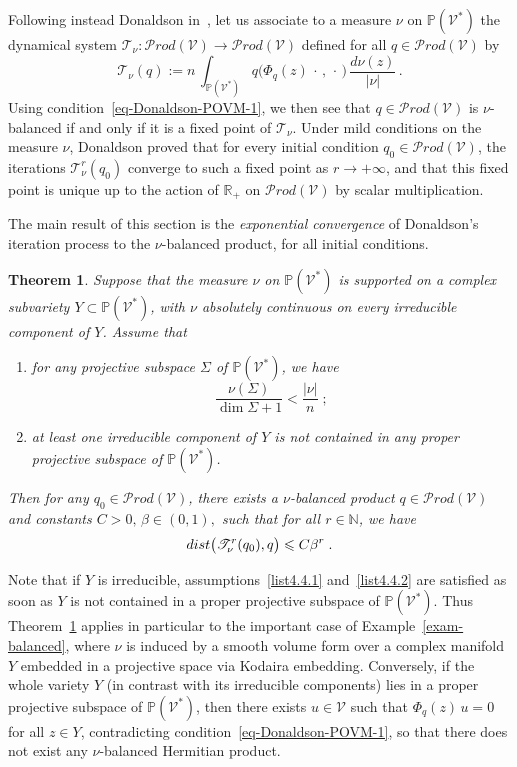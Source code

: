 \documentclass[11pt]{article}
\newtheorem{theo}{Theorem}[section]
\theoremstyle{definition}
\numberwithin{equation}{section}
\numberwithin{figure}{section}
\numberwithin{table}{section}
\let\cal\mathscr
\newcommand{\PPP}{{\mathbb{P}}}
\newcommand{\R}{{\mathbb{R}}}
\newcommand{\N}{{\mathbb{N}}}
\newcommand{\cV}{{\mathcal{V}}}
\renewcommand\leq {\leqslant}
\newcommand\< {\mathcal{h}}
\renewcommand\> {\mathcal{i}}
\newcommand\TT {{\cal T}}
\newcommand{\Prod}{{\mathcal Prod}}
\newcommand*{\romanenumi}{\renewcommand*{\theenumi}{\roman{enumi}}}
\begin{document}
Following instead Donaldson in~\cite{D}, let us associate to a measure $\nu$ on $\PPP(\cV^*)$ the dynamical system $\TT_\nu:\Prod(\cV)\rightarrow\Prod(\cV)$ defined for all $q\in\Prod(\cV)$ by
\begin{equation}\label{Tnudefcan}
\TT_\nu(q):=n\,\int_{\PPP (\cV^*)} q\big(\Phi_q(z)\,\cdot\,,\,\cdot\,\big)
\,\frac{d\nu(z)}{|\nu|}\,.
\end{equation}
Using condition~\eqref{eq-Donaldson-POVM-1}, we then see that $q\in\Prod(\cV)$ is $\nu$-balanced if and only if it is a fixed point of $\TT_\nu$. Under mild conditions on the measure $\nu$, Donaldson proved that for every initial condition $q_0\in\Prod(\cV)$, the iterations $\TT_\nu^r (q_0)$ converge to such a fixed point as $r \to +\infty$, and that this fixed point is unique up to the action of $\R_+$ on $\Prod(\cV)$ by scalar multiplication.

The main result of this section is the \emph{exponential convergence} of Donaldson's iteration process to the $\nu$-balanced product, for all initial conditions.

\begin{theo}\label{thm-expcvcor}
Suppose that the measure $\nu$ on $\PPP(\cV^*)$ is supported on a complex subvariety $Y \subset \PPP(\cV^*)$, with $\nu$ absolutely continuous on every irreducible component of $Y$. Assume that
\begin{enumerate}\romanenumi
\item \label{list4.4.1}for any projective subspace $\Sigma$ of $\PPP(\cV^*)$, we have
\begin{equation}\label{eq-spade-1}
\frac{\nu(\Sigma)}{\dim \Sigma +1} < \frac{|\nu|}{n}\;;
\end{equation}
\item \label{list4.4.2} at least one irreducible component of $Y$ is not contained in any proper projective subspace of $\PPP(\cV^*)$.
\end{enumerate}
Then for any $q_0\in\Prod(\cV)$, there exists a $\nu$-balanced product $q\in\Prod(\cV)$ and constants $C>0,\,\beta\in(0,1),$ such that for all $r\in\N$, we have
\begin{equation}\label{expcvest}
\textup{dist}\big(\TT_\nu^r(q_0),q\big)\leq C\beta^r\;.
\end{equation}
\end{theo}



Note that if $Y$ is irreducible, assumptions~\eqref{list4.4.1} and~\eqref{list4.4.2} are satisfied as soon as $Y$ is not contained in a proper projective subspace of $\PPP(\cV^*)$. Thus Theorem~\ref{thm-expcvcor} applies in particular to the important case of Example~\ref{exam-balanced}, where $\nu$ is induced by a smooth volume form over a complex manifold $Y$ embedded in a projective space via Kodaira embedding. Conversely, if the whole variety $Y$ (in contrast with its irreducible components) lies in a proper projective subspace of $\PPP(\cV^*)$, then there exists $u\in\cV$ such that $\Phi_q(z)\,u=0$ for all $z\in Y$, contradicting condition~\eqref{eq-Donaldson-POVM-1}, so that there does not exist any $\nu$-balanced Hermitian product.
\end{document}
